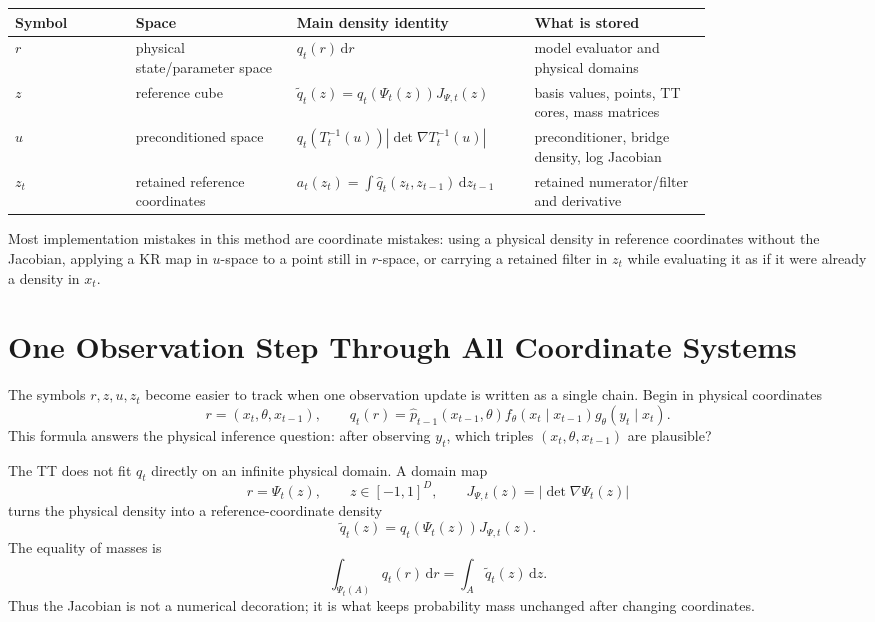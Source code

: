 \documentclass[11pt]{article}
\numberwithin{equation}{section}
\newcommand{\dd}{\,\mathrm d}
\begin{document}
\begin{center}
\begin{tabular}{p{0.15\linewidth}p{0.20\linewidth}p{0.24\linewidth}p{0.22\linewidth}}
\toprule
Symbol & Space & Main density identity & What is stored\\
\midrule
\(r\) & physical state/parameter space &
\(q_t(r)\dd r\) &
model evaluator and physical domains\\
\(z\) & reference cube &
\(\widetilde q_t(z)=q_t(\Psi_t(z))J_{\Psi,t}(z)\) &
basis values, points, TT cores, mass matrices\\
\(u\) & preconditioned space &
\(q_t(T_t^{-1}(u))|\det\nabla T_t^{-1}(u)|\) &
preconditioner, bridge density, log Jacobian\\
\(z_t\) & retained reference coordinates &
\(a_t(z_t)=\int\widehat q_t(z_t,z_{t-1})\dd z_{t-1}\) &
retained numerator/filter and derivative\\
\bottomrule
\end{tabular}
\end{center}

Most implementation mistakes in this method are coordinate mistakes: using a
physical density in reference coordinates without the Jacobian, applying a KR
map in \(u\)-space to a point still in \(r\)-space, or carrying a retained
filter in \(z_t\) while evaluating it as if it were already a density in
\(x_t\).

\section{One Observation Step Through All Coordinate Systems}

The symbols \(r,z,u,z_t\) become easier to track when one observation update is
written as a single chain.  Begin in physical coordinates
\begin{equation}
    r=(x_t,\theta,x_{t-1}),
    \qquad
    q_t(r)
    =
    \widehat p_{t-1}(x_{t-1},\theta)
    f_\theta(x_t\mid x_{t-1})
    g_\theta(y_t\mid x_t).
    \label{eq:p25-walk-1}
\end{equation}
This formula answers the physical inference question: after observing \(y_t\),
which triples \((x_t,\theta,x_{t-1})\) are plausible?

The TT does not fit \(q_t\) directly on an infinite physical domain.  A domain
map
\begin{equation}
    r=\Psi_t(z),
    \qquad
    z\in[-1,1]^D,
    \qquad
    J_{\Psi,t}(z)=|\det\nabla\Psi_t(z)|
    \label{eq:p25-walk-2}
\end{equation}
turns the physical density into a reference-coordinate density
\begin{equation}
    \widetilde q_t(z)
    =
    q_t(\Psi_t(z))J_{\Psi,t}(z).
    \label{eq:p25-walk-3}
\end{equation}
The equality of masses is
\begin{equation}
    \int_{\Psi_t(A)} q_t(r)\dd r
    =
    \int_A \widetilde q_t(z)\dd z.
    \label{eq:p25-walk-4}
\end{equation}
Thus the Jacobian is not a numerical decoration; it is what keeps probability
mass unchanged after changing coordinates.
\end{document}
